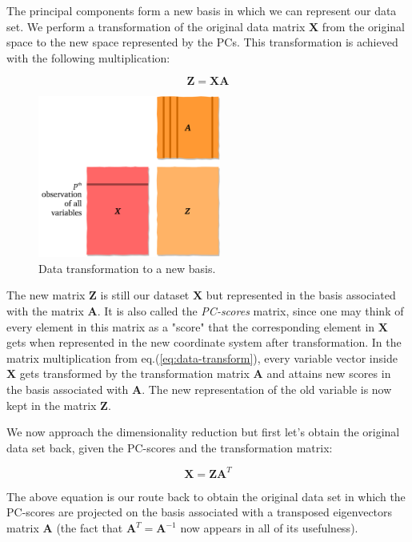 \documentclass[10pt,twocolumn]{article}
\begin{document}
The principal components form a new basis in which we can represent our data set. We perform a transformation of the original data matrix $\bm{X}$ from the original space to the new space represented by the PCs. This transformation is achieved with the following multiplication:

\begin{equation} \label{eq:data-transform}
\bm{Z} = \bm{X} \bm{A}
\end{equation}

\begin{figure}[H]
\centering\includegraphics[width=6cm]{data-transformation.png}
\caption{Data transformation to a new basis.}
\label{fig:data-transformation}
\end{figure}

The new matrix $\bm{Z}$ is still our dataset $\bm{X}$ but represented in the basis associated with the matrix $\bm{A}$. It is also called the \textit{PC-scores} matrix, since one may think of every element in this matrix as a "score" that the corresponding element in $\bm{X}$ gets when represented in the new coordinate system after transformation. In the matrix multiplication from eq.(\ref{eq:data-transform}), every variable vector inside $\bm{X}$ gets transformed by the transformation matrix $\bm{A}$ and attains new scores in the basis associated with $\bm{A}$. The new representation of the old variable is now kept in the matrix $\bm{Z}$.



We now approach the dimensionality reduction but first let's obtain the original data set back, given the PC-scores and the transformation matrix:

\begin{equation} \label{eq:X-retrieval}
\bm{X} = \bm{Z} \bm{A}^T
\end{equation}

The above equation is our route back to obtain the original data set in which the PC-scores are projected on the basis associated with a transposed eigenvectors matrix $\bm{A}$ (the fact that $\bm{A}^T = \bm{A}^{-1}$ now appears in all  of its usefulness).
\end{document}
